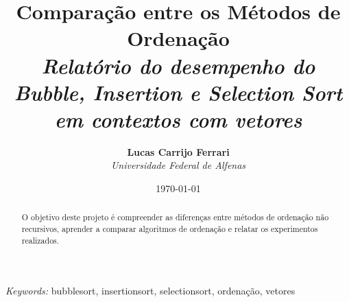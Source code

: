 \documentclass[11pt]{diazessay} %
\title{\textbf{Comparação entre os Métodos de Ordenação} \\ {\Large\itshape Relatório do desempenho do Bubble, Insertion e Selection Sort em contextos com vetores}} %
\author{\textbf{Lucas Carrijo Ferrari} \\ \textit{Universidade Federal de Alfenas}} %
\date{\today} %
\begin{document}
\maketitle %



\begin{abstract}
O objetivo deste projeto é compreender as diferenças entre métodos de ordenação não recursivos, aprender a comparar algoritmos de ordenação e relatar os experimentos realizados.
\end{abstract}

\hspace*{3.6mm}\textit{Keywords:} bubblesort, insertionsort, selectionsort, ordenação, vetores %

\vspace{30pt} %













\end{document}
